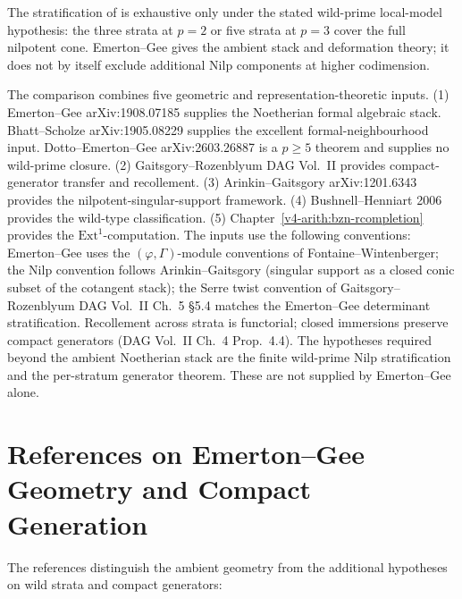 \begin{remark}
\label{v4-arith:w5-g:f1a3-C:rem:no-boundary-obstruction}
The stratification of
 is exhaustive only
under the stated wild-prime local-model hypothesis:
the three strata at \(p=2\) or five strata at \(p=3\) cover the full
nilpotent cone. Emerton--Gee gives the ambient stack and deformation
theory; it does not by itself exclude additional Nilp components at
higher codimension.
\end{remark}

\begin{remark}
\label{v4-arith:w5-g:f1a3-C:rem:source-disjointness}
The comparison combines five geometric and representation-theoretic inputs.
(1) Emerton--Gee arXiv:1908.07185 supplies the Noetherian formal
algebraic stack. Bhatt--Scholze arXiv:1905.08229 supplies the
excellent formal-neighbourhood input. Dotto--Emerton--Gee
arXiv:2603.26887 is a \(p\geq 5\) theorem and supplies no wild-prime
closure.
(2) Gaitsgory--Rozenblyum DAG Vol.~II provides compact-generator transfer
and recollement.
(3) Arinkin--Gaitsgory arXiv:1201.6343 provides the nilpotent-singular-support
framework.
(4) Bushnell--Henniart 2006 provides the wild-type classification.
(5) Chapter~\ref{v4-arith:bzn-rcompletion} provides the \(\mathrm{Ext}^{1}\)-computation.
The inputs use the following conventions: Emerton--Gee uses the
\((\varphi,\Gamma)\)-module conventions of Fontaine--Wintenberger; the
Nilp convention follows Arinkin--Gaitsgory (singular support as a closed
conic subset of the cotangent stack); the Serre twist convention of
Gaitsgory--Rozenblyum DAG Vol.~II Ch.~5 \S 5.4 matches the
Emerton--Gee determinant stratification. Recollement across strata
is functorial; closed immersions preserve compact generators (DAG
Vol.~II Ch.~4 Prop.~4.4). The hypotheses required beyond the ambient
Noetherian stack are the finite wild-prime Nilp stratification and the
per-stratum generator theorem. These are not supplied by Emerton--Gee
alone. 
\end{remark}

\section{References on Emerton--Gee Geometry and Compact Generation}
\label{v4-arith:w5-g:f1a3-C:biblio}

The references distinguish the ambient geometry from the additional
hypotheses on wild strata and compact generators:

